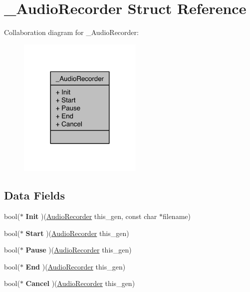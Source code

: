\hypertarget{struct__AudioRecorder}{\section{\-\_\-\-Audio\-Recorder Struct Reference}
\label{struct__AudioRecorder}
}


Collaboration diagram for \-\_\-\-Audio\-Recorder\-:\nopagebreak
\begin{figure}[H]
\begin{center}
\leavevmode
\includegraphics[width=168pt]{d1/dd1/struct__AudioRecorder__coll__graph}
\end{center}
\end{figure}
\subsection*{Data Fields}
\begin{DoxyCompactItemize}
\item 
\hypertarget{struct__AudioRecorder_aa824331e924d234cef8f42d3a33fe207}{bool($\ast$ {\bfseries Init} )(\hyperlink{struct__AudioRecorder}{Audio\-Recorder} this\-\_\-gen, const char $\ast$filename)}\label{struct__AudioRecorder_aa824331e924d234cef8f42d3a33fe207}

\item 
\hypertarget{struct__AudioRecorder_a5bdb791974e138cf77184066ec1d831a}{bool($\ast$ {\bfseries Start} )(\hyperlink{struct__AudioRecorder}{Audio\-Recorder} this\-\_\-gen)}\label{struct__AudioRecorder_a5bdb791974e138cf77184066ec1d831a}

\item 
\hypertarget{struct__AudioRecorder_a6cebef5057aafab49be1d7c32113d393}{bool($\ast$ {\bfseries Pause} )(\hyperlink{struct__AudioRecorder}{Audio\-Recorder} this\-\_\-gen)}\label{struct__AudioRecorder_a6cebef5057aafab49be1d7c32113d393}

\item 
\hypertarget{struct__AudioRecorder_a06419a161983064bcf4ca4c9754501e7}{bool($\ast$ {\bfseries End} )(\hyperlink{struct__AudioRecorder}{Audio\-Recorder} this\-\_\-gen)}\label{struct__AudioRecorder_a06419a161983064bcf4ca4c9754501e7}

\item 
\hypertarget{struct__AudioRecorder_a6d00375d2977b1cc582d2489acd46a26}{bool($\ast$ {\bfseries Cancel} )(\hyperlink{struct__AudioRecorder}{Audio\-Recorder} this\-\_\-gen)}\label{struct__AudioRecorder_a6d00375d2977b1cc582d2489acd46a26}

\end{DoxyCompactItemize}


